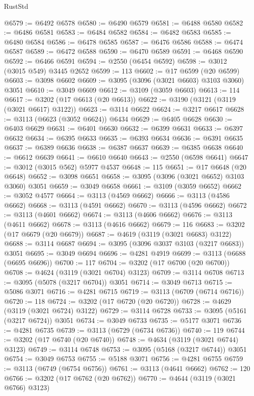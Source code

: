 \begin{lexlean}{RustStd}
\begin{coremodule}
@6579 := @6492 @6578
@6580 := @6490 @6579
@6581 := @6488 @6580
@6582 := @6486 @6581
@6583 := @6484 @6582
@6584 := @6482 @6583
@6585 := @6480 @6584
@6586 := @6478 @6585
@6587 := @6476 @6586
@6588 := @6474 @6587
@6589 := @6472 @6588
@6590 := @6470 @6589
@6591 := @6468 @6590
@6592 := @6466 @6591
@6594 := @2550 (@6454 @6592)
@6598 := @3012 (@3015 @549) @3445 @2652
@6599 := 113
@6602 := @17 @6599 (@20 @6599)
@6603 := @3098 @6602
@6609 := @3095 (@3096 (@3021 @6603) @3103 @3060) @3051
@6610 := @3049 @6609
@6612 := @3109 (@3059 @6603)
@6613 := 114
@6617 := @3202 (@17 @6613 (@20 @6613))
@6622 := @3190 (@3121 (@3119 (@3021 @6617) @3122))
@6623 := @3114 @6622
@6624 := @3217 @6617
@6628 := @3113 (@6623 (@3052 @6624)) @6434
@6629 := @6405 @6628
@6630 := @6403 @6629
@6631 := @6401 @6630
@6632 := @6399 @6631
@6633 := @6397 @6632
@6634 := @6395 @6633
@6635 := @6393 @6634
@6636 := @6391 @6635
@6637 := @6389 @6636
@6638 := @6387 @6637
@6639 := @6385 @6638
@6640 := @6612 @6639
@6641 := @6610 @6640
@6643 := @2550 (@6598 @6641)
@6647 := @3012 (@3015 @562) @5977 @4537
@6648 := 115
@6651 := @17 @6648 (@20 @6648)
@6652 := @3098 @6651
@6658 := @3095 (@3096 (@3021 @6652) @3103 @3060) @3051
@6659 := @3049 @6658
@6661 := @3109 (@3059 @6652)
@6662 := @3052 @4577
@6664 := @3113 (@4569 @6662)
@6666 := @3113 (@4586 @6662)
@6668 := @3113 (@4591 @6662)
@6670 := @3113 (@4596 @6662)
@6672 := @3113 (@4601 @6662)
@6674 := @3113 (@4606 @6662)
@6676 := @3113 (@4611 @6662)
@6678 := @3113 (@4616 @6662)
@6679 := 116
@6683 := @3202 (@17 @6679 (@20 @6679))
@6687 := @4619 (@3119 (@3021 @6683) @3122)
@6688 := @3114 @6687
@6694 := @3095 (@3096 @3037 @3103 (@3217 @6683)) @3051
@6695 := @3049 @6694
@6696 := @4281 @4919
@6699 := @3113 (@6688 (@6695 @6696))
@6700 := 117
@6704 := @3202 (@17 @6700 (@20 @6700))
@6708 := @4624 (@3119 (@3021 @6704) @3123)
@6709 := @3114 @6708
@6713 := @3095 (@5078 (@3217 @6704)) @3051
@6714 := @3049 @6713
@6715 := @5086 @3071
@6716 := @4281 @6715
@6719 := @3113 (@6709 (@6714 @6716))
@6720 := 118
@6724 := @3202 (@17 @6720 (@20 @6720))
@6728 := @4629 (@3119 (@3021 @6724) @3122)
@6729 := @3114 @6728
@6733 := @3095 (@5161 (@3217 @6724)) @3051
@6734 := @3049 @6733
@6735 := @5177 @3071
@6736 := @4281 @6735
@6739 := @3113 (@6729 (@6734 @6736))
@6740 := 119
@6744 := @3202 (@17 @6740 (@20 @6740))
@6748 := @4634 (@3119 (@3021 @6744) @3123)
@6749 := @3114 @6748
@6753 := @3095 (@5168 (@3217 @6744)) @3051
@6754 := @3049 @6753
@6755 := @5188 @3071
@6756 := @4281 @6755
@6759 := @3113 (@6749 (@6754 @6756))
@6761 := @3113 (@4641 @6662)
@6762 := 120
@6766 := @3202 (@17 @6762 (@20 @6762))
@6770 := @4644 (@3119 (@3021 @6766) @3123)

\end{coremodule}
\end{lexlean}
